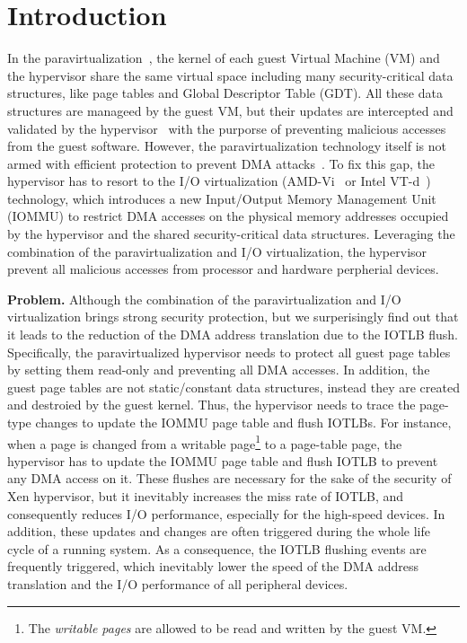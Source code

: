 \section{Introduction} \label{sec:intro}
In the paravirtualization~\cite{XEN-SOSP03,denali-paravirtualization}, the kernel of each guest Virtual Machine (VM) and the hypervisor share the same virtual space including many security-critical data structures, like page tables and Global Descriptor Table (GDT). All these data structures are manageed by the guest VM, but their updates are intercepted and validated by the hypervisor~\cite{XEN-SOSP03} with the purporse of preventing malicious accesses from the guest software.
However, the paravirtualization technology itself is not armed with efficient protection to prevent DMA attacks~\cite{disaggregation}.
To fix this gap, the hypervisor has to resort to the I/O virtualization (AMD-Vi~\cite{amdvt} or Intel VT-d~\cite{intelvt}) technology, which introduces a new Input/Output Memory Management Unit (IOMMU) to restrict DMA accesses on the physical memory addresses occupied by the hypervisor and the shared security-critical data structures. 
Leveraging the combination of the paravirtualization and I/O virtualization, the hypervisor prevent all malicious accesses from processor and hardware perpherial devices.

\textbf{Problem.} Although the combination of the paravirtualization and I/O virtualization brings strong security protection, but we surperisingly find out that it leads to the reduction of the DMA address translation due to the IOTLB flush. 
Specifically, the paravirtualized hypervisor needs to protect all guest page tables 
by setting them read-only and preventing all DMA accesses.  
In addition, the guest page tables are not static/constant data structures, 
instead they are created and destroied by the guest kernel.
Thus, the hypervisor needs to trace the page-type changes to update the IOMMU page table and flush IOTLBs.
For instance, when a page is changed from a writable page\footnote{The \emph{writable pages} are allowed to be read and written by the guest VM.}  
to a page-table page, the hypervisor has to update the IOMMU page table and flush IOTLB to prevent any DMA access on it.
These flushes are necessary for the sake of the security of Xen hypervisor, but it inevitably increases the miss rate of IOTLB, and consequently reduces I/O performance, especially for the high-speed devices. 
In addition, these updates and changes are often triggered during the whole life cycle of a running system.
As a consequence, the IOTLB flushing events are frequently triggered, which inevitably lower the speed of the DMA address translation and the I/O performance of all peripheral devices.

